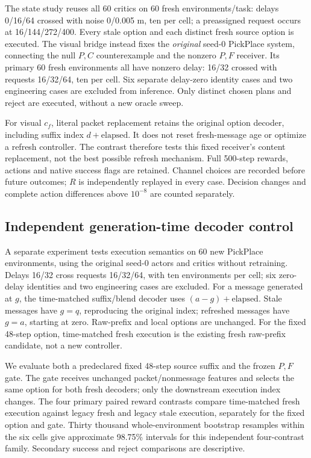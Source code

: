 The state study reuses all 60 critics on 60 fresh environments/task: delays 0/16/64 crossed with noise 0/0.005 m, ten per cell; a preassigned request occurs at 16/144/272/400. Every stale option and each distinct fresh source option is executed. The visual bridge instead fixes the \emph{original} seed-0 PickPlace system, connecting the null $P,C$ counterexample and the nonzero $P,F$ receiver. Its primary 60 fresh environments all have nonzero delay: 16/32 crossed with requests 16/32/64, ten per cell. Six separate delay-zero identity cases and two engineering cases are excluded from inference. Only distinct chosen plans and reject are executed, without a new oracle sweep.

For visual $c_f$, literal packet replacement retains the original option decoder, including suffix index $d+\text{elapsed}$. It does not reset fresh-message age or optimize a refresh controller. The contrast therefore tests this fixed receiver's content replacement, not the best possible refresh mechanism. Full 500-step rewards, actions and native success flags are retained. Channel choices are recorded before future outcomes; $R$ is independently replayed in every case. Decision changes and complete action differences above $10^{-8}$ are counted separately.

\subsection{Independent generation-time decoder control}\label{sec:decodersetup}
A separate experiment tests execution semantics on 60 new PickPlace environments, using the original seed-0 actors and critics without retraining. Delays 16/32 cross requests 16/32/64, with ten environments per cell; six zero-delay identities and two engineering cases are excluded. For a message generated at $g$, the time-matched suffix/blend decoder uses $(a-g)+\text{elapsed}$. Stale messages have $g=q$, reproducing the original index; refreshed messages have $g=a$, starting at zero. Raw-prefix and local options are unchanged. For the fixed 48-step option, time-matched fresh execution is the existing fresh raw-prefix candidate, not a new controller.

We evaluate both a predeclared fixed 48-step source suffix and the frozen $P,F$ gate. The gate receives unchanged packet/nonmessage features and selects the same option for both fresh decoders; only the downstream execution index changes. The four primary paired reward contrasts compare time-matched fresh execution against legacy fresh and legacy stale execution, separately for the fixed option and gate. Thirty thousand whole-environment bootstrap resamples within the six cells give approximate 98.75\% intervals for this independent four-contrast family. Secondary success and reject comparisons are descriptive.

